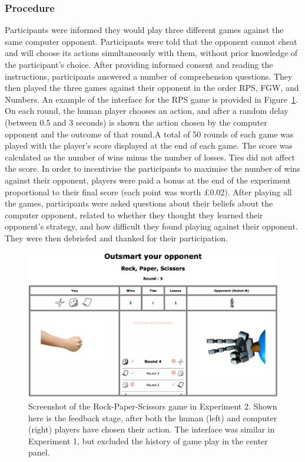 \documentclass[english,man,floatsintext]{apa6}
\begin{document}
\hypertarget{procedure}{%
\subsubsection{Procedure}\label{procedure}}

Participants were informed they would play three different games against the same computer opponent. Participants were told that the opponent cannot cheat and will choose its actions simultaneously with them, without prior knowledge of the participant's choice. After providing informed consent and reading the instructions, participants answered a number of comprehension questions. They then played the three games against their opponent in the order RPS, FGW, and Numbers. An example of the interface for the RPS game is provided in Figure~\ref{fig:feedback-rps-exp2}. On each round, the human player chooses an action, and after a random delay (between 0.5 and 3 seconds) is shown the action chosen by the computer opponent and the outcome of that round.A total of 50 rounds of each game was played with the player's score displayed at the end of each game. The score was calculated as the number of wins minus the number of losses. Ties did not affect the score. In order to incentivise the participants to maximise the number of wins against their opponent, players were paid a bonus at the end of the experiment proportional to their final score (each point was worth £0.02). After playing all the games, participants were asked questions about their beliefs about the computer opponent, related to whether they thought they learned their opponent's strategy, and how difficult they found playing against their opponent. They were then debriefed and thanked for their participation.

\begin{figure}

{\centering \includegraphics{images/feedback_rps} 

}

\caption{Screenshot of the Rock-Paper-Scissors game in Experiment 2. Shown here is the feedback stage, after both the human (left) and computer (right) players have chosen their action. The interface was similar in Experiment 1, but excluded the history of game play in the center panel.}\label{fig:feedback-rps-exp2}
\end{figure}
\end{document}
